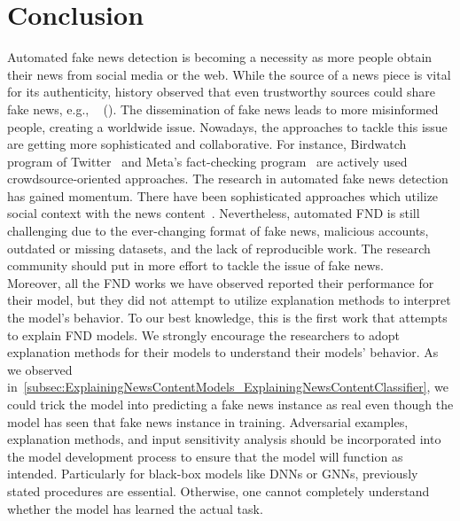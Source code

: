 
\chapter{Conclusion}\label{chapter:conclusion}
Automated fake news detection is becoming a necessity as more people obtain their news from social media or the web. While the source of a news piece is vital for its authenticity, history observed that even trustworthy sources could share fake news, e.g., ~\citeauthor{TheGreatMoonHoax_Foster} (\citeyear{TheGreatMoonHoax_Foster}). The dissemination of fake news leads to more misinformed people, creating a worldwide issue. Nowadays, the approaches to tackle this issue are getting more sophisticated and collaborative. For instance, Birdwatch program of Twitter~\parencite{BirdwatchOverview_Twitter} and Meta's fact-checking program~\parencite{MetaFactCheckingProgram_Meta} are actively used crowdsource-oriented approaches. The research in automated fake news detection has gained momentum. There have been sophisticated approaches which utilize social context with the news content~\parencite{UPFD_Dataset_Shu, FakeNewsDetectionUsingGeometricDeepLearning_Monti}. Nevertheless, automated FND is still challenging due to the ever-changing format of fake news, malicious accounts, outdated or missing datasets, and the lack of reproducible work. The research community should put in more effort to tackle the issue of fake news.\\
Moreover, all the FND works we have observed reported their performance for their model, but they did not attempt to utilize explanation methods to interpret the model's behavior. To our best knowledge, this is the first work that attempts to explain FND models. We strongly encourage the researchers to adopt explanation methods for their models to understand their models' behavior. As we observed in~\ref{subsec:ExplainingNewsContentModels_ExplainingNewsContentClassifier}, we could trick the model into predicting a fake news instance as real even though the model has seen that fake news instance in training. Adversarial examples, explanation methods, and input sensitivity analysis should be incorporated into the model development process to ensure that the model will function as intended. Particularly for black-box models like DNNs or GNNs, previously stated procedures are essential. Otherwise, one cannot completely understand whether the model has learned the actual task.\\
